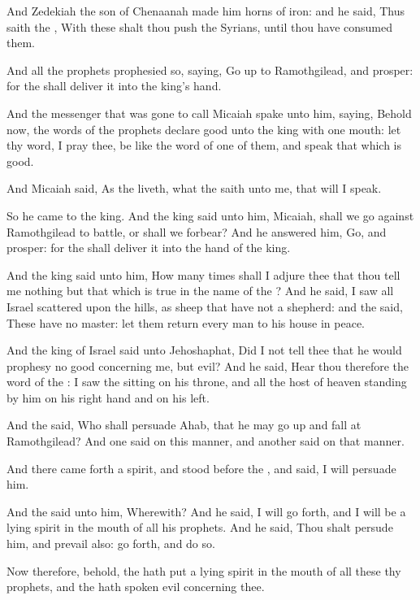 \Verse And Zedekiah the son of Chenaanah made him horns of iron: and he said, Thus saith the \LORD, With these shalt thou push the Syrians, until thou have consumed them.

\Verse And all the prophets prophesied so, saying, Go up to Ramothgilead, and prosper: for the \LORD shall deliver it into the king's hand.

\Verse And the messenger that was gone to call Micaiah spake unto him, saying, Behold now, the words of the prophets declare good unto the king with one mouth: let thy word, I pray thee, be like the word of one of them, and speak that which is good.

\Verse And Micaiah said, As the \LORD liveth, what the \LORD saith unto me, that will I speak.

\Verse So he came to the king. And the king said unto him, Micaiah, shall we go against Ramothgilead to battle, or shall we forbear? And he answered him, Go, and prosper: for the \LORD shall deliver it into the hand of the king.

\Verse And the king said unto him, How many times shall I adjure thee that thou tell me nothing but that which is true in the name of the \LORD?  \Verse And he said, I saw all Israel scattered upon the hills, as sheep that have not a shepherd: and the \LORD said, These have no master: let them return every man to his house in peace.

\Verse And the king of Israel said unto Jehoshaphat, Did I not tell thee that he would prophesy no good concerning me, but evil?  \Verse And he said, Hear thou therefore the word of the \LORD: I saw the \LORD sitting on his throne, and all the host of heaven standing by him on his right hand and on his left.

\Verse And the \LORD said, Who shall persuade Ahab, that he may go up and fall at Ramothgilead? And one said on this manner, and another said on that manner.

\Verse And there came forth a spirit, and stood before the \LORD, and said, I will persuade him.

\Verse And the \LORD said unto him, Wherewith? And he said, I will go forth, and I will be a lying spirit in the mouth of all his prophets.  And he said, Thou shalt persude him, and prevail also: go forth, and do so.

\Verse Now therefore, behold, the \LORD hath put a lying spirit in the mouth of all these thy prophets, and the \LORD hath spoken evil concerning thee.

